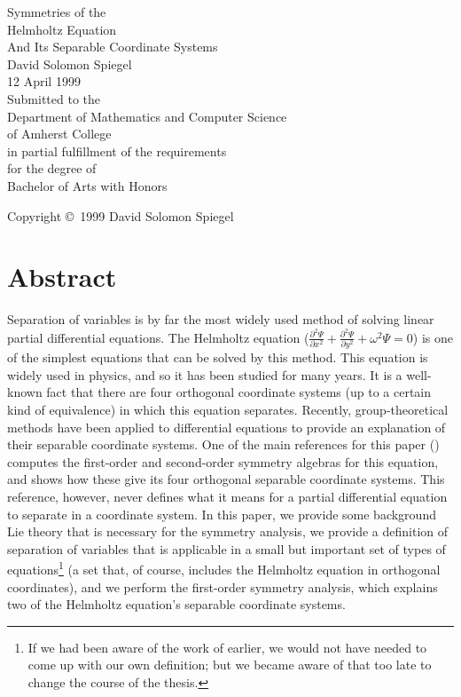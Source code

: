 \documentclass[11 pt]{report}
\newcommand{\parr}[2]{\frac{\partial #1}{\partial #2}}
\begin{document}
\baselineskip 21pt
\evensidemargin 0.25in
\footnotesep 14pt

\begin{titlepage}
\mbox{}
\vspace{1in}
\begin{center}
\LARGE Symmetries of the \\
Helmholtz Equation \\[0.2in]
\normalsize And Its Separable Coordinate Systems \\[2in]
\normalsize David Solomon Spiegel \\[\medskipamount]
12 April 1999 \\[1in]
Submitted to the \\
Department of Mathematics and Computer Science \\
of Amherst College \\
in partial fulfillment of the requirements \\
for the degree of \\
Bachelor of Arts with Honors
\end{center}
\vfill
\begin{center}
Copyright \copyright\ 1999 David Solomon Spiegel
\end{center}
\end{titlepage}

\evensidemargin 0in

\chapter*{Abstract}

Separation of variables is by far the most widely used method of solving linear partial differential equations.  The Helmholtz equation ($\parr{^2\Psi}{x^2} + \parr{^2\Psi}{y^2} + \omega^2\Psi = 0$) is one of the simplest equations that can be solved by this method.  This equation is widely used in physics, and so it has been studied for many years.  It is a well-known fact that there are four orthogonal coordinate systems (up to a certain kind of equivalence) in which this equation separates.  Recently, group-theoretical methods have been applied to differential equations to provide an explanation of their separable coordinate systems.  One of the main references for this paper (\cite{miller}) computes the first-order and second-order symmetry algebras for this equation, and shows how these give its four orthogonal separable coordinate systems.  This reference, however, never defines what it means for a partial differential equation to separate in a coordinate system.  In this paper, we provide some background Lie theory that is necessary for the symmetry analysis, we provide a definition of separation of variables that is applicable in a small but important set of types of equations\footnote{If we had been aware of the work of \cite{koornwinder} earlier, we would not have needed to come up with our own definition; but we became aware of that too late to change the course of the thesis.} (a set that, of course, includes the Helmholtz equation in orthogonal coordinates), and we perform the first-order symmetry analysis, which explains two of the Helmholtz equation's separable coordinate systems.
\end{document}
